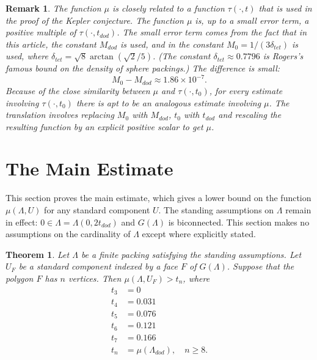 \documentclass{article} %
\newtheorem{theorem}{Theorem}[section]
\newtheorem{remark}[lemma]{Remark}
\begin{document}
\begin{remark}
  \label{rem:sq} 
  The function $\mu$ is closely related to a function $\tau(\cdot,t)$
  that is used in the proof of the Kepler conjecture. The function $\mu$
  is, up to a small error term, a positive multiple of
  $\tau(\cdot,t_{dod})$. The small error term comes from the fact that
  in this article, the constant $M_{dod}$ is used, and in
  \cite{Hales:2006:DCG} the constant $M_0=1/(3 \delta_{tet})$ is used,
  where $\delta_{tet} = \sqrt8 \arctan(\sqrt2/5)$. (The constant
  $\delta_{tet}\approx 0.7796$ is Rogers's famous bound on the density
  of sphere packings.) The difference is small:
  $$M_0 - M_{dod} \approx 1.86 \times 10^{-7}.$$
  Because of the close similarity between $\mu$ and $\tau(\cdot,t_0)$,
  for every estimate involving $\tau(\cdot,t_0)$ there is apt to be an
  analogous estimate involving $\mu$. The translation involves replacing
  $M_0$ with $M_{dod}$, $t_0$ with $t_{dod}$ and rescaling the resulting
  function by an explicit positive scalar to get $\mu$.
\end{remark}


\section{The Main Estimate}

This section proves the main estimate, which gives a lower bound on
the function $\mu(\Lambda,U)$ for any standard component $U$. The
standing assumptions on $\Lambda$ remain in effect: $0\in\Lambda=
\Lambda(0,2t_{dod})$ and $G(\Lambda)$ is biconnected. This section
makes no assumptions on the cardinality of $\Lambda$ except where
explicitly stated.

\begin{theorem}\label{thm:main}  
Let $\Lambda$ be a finite packing satisfying the
standing assumptions.  Let $U_F$ be a standard component indexed by
a face $F$ of $G(\Lambda)$.  Suppose that the polygon 
$F$ has $n$ vertices.  Then
   $\mu(\Lambda,U_F) > t_n$, where 
$$
\begin{array}{lll}
 t_3 &= 0\\
 t_4 &= 0.031\\
 t_5 &= 0.076\\
 t_6 &= 0.121\\
 t_7 &= 0.166\\
 t_n &= \mu(\Lambda_{dod}),\quad n\ge 8.
\end{array}
$$
\end{theorem}
\end{document}
